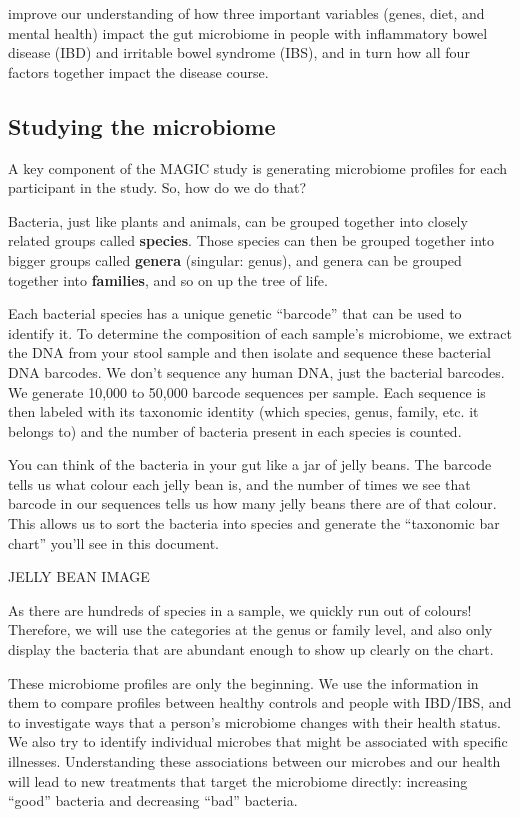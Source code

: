 \documentclass[
]{article}
\begin{document}
improve our understanding of how three important variables (genes, diet,
and mental health) impact the gut microbiome in people with inflammatory
bowel disease (IBD) and irritable bowel syndrome (IBS), and in turn how
all four factors together impact the disease course.

\subsection{Studying the microbiome}

A key component of the MAGIC study is generating microbiome profiles for
each participant in the study. So, how do we do that?

Bacteria, just like plants and animals, can be grouped together into
closely related groups called \textbf{species}. Those species can then
be grouped together into bigger groups called \textbf{genera} (singular:
genus), and genera can be grouped together into \textbf{families}, and
so on up the tree of life.

Each bacterial species has a unique genetic ``barcode'' that can be used
to identify it. To determine the composition of each sample's
microbiome, we extract the DNA from your stool sample and then isolate
and sequence these bacterial DNA barcodes. We don't sequence any human
DNA, just the bacterial barcodes. We generate 10,000 to 50,000 barcode
sequences per sample. Each sequence is then labeled with its taxonomic
identity (which species, genus, family, etc. it belongs to) and the
number of bacteria present in each species is counted.

You can think of the bacteria in your gut like a jar of jelly beans. The
barcode tells us what colour each jelly bean is, and the number of times
we see that barcode in our sequences tells us how many jelly beans there
are of that colour. This allows us to sort the bacteria into species and
generate the ``taxonomic bar chart'' you'll see in this document.

JELLY BEAN IMAGE

As there are hundreds of species in a sample, we quickly run out of
colours! Therefore, we will use the categories at the genus or family
level, and also only display the bacteria that are abundant enough to
show up clearly on the chart.

These microbiome profiles are only the beginning. We use the information
in them to compare profiles between healthy controls and people with
IBD/IBS, and to investigate ways that a person's microbiome changes with
their health status. We also try to identify individual microbes that
might be associated with specific illnesses. Understanding these
associations between our microbes and our health will lead to new
treatments that target the microbiome directly: increasing ``good''
bacteria and decreasing ``bad'' bacteria.
\end{document}
